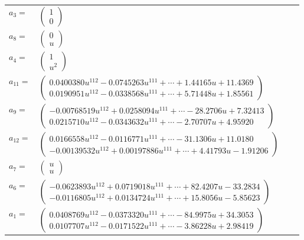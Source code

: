 \documentclass[1p]{elsarticle_modified}
\theoremstyle{definition}
\begin{document}
\begin{tabular}{m{7pt} m{180pt} m{7pt} m{180pt} }
\flushright $a_{3}=$&$\begin{pmatrix}1\\0\end{pmatrix}$ \\
\flushright $a_{8}=$&$\begin{pmatrix}0\\u\end{pmatrix}$ \\
\flushright $a_{4}=$&$\begin{pmatrix}1\\u^2\end{pmatrix}$ \\
\flushright $a_{11}=$&$\begin{pmatrix}0.0400380 u^{112}-0.0745263 u^{111}+\cdots+1.44165 u+11.4369\\0.0190951 u^{112}-0.0338568 u^{111}+\cdots+5.71448 u+1.85561\end{pmatrix}$ \\
\flushright $a_{9}=$&$\begin{pmatrix}-0.00768519 u^{112}+0.0258094 u^{111}+\cdots-28.2706 u+7.32413\\0.0215710 u^{112}-0.0343632 u^{111}+\cdots-2.70707 u+4.95920\end{pmatrix}$ \\
\flushright $a_{12}=$&$\begin{pmatrix}0.0166558 u^{112}-0.0116771 u^{111}+\cdots-31.1306 u+11.0180\\-0.00139532 u^{112}+0.00197886 u^{111}+\cdots+4.41793 u-1.91206\end{pmatrix}$ \\
\flushright $a_{7}=$&$\begin{pmatrix}u\\u\end{pmatrix}$ \\
\flushright $a_{6}=$&$\begin{pmatrix}-0.0623893 u^{112}+0.0719018 u^{111}+\cdots+82.4207 u-33.2834\\-0.0116805 u^{112}+0.0134724 u^{111}+\cdots+15.8056 u-5.85623\end{pmatrix}$ \\
\flushright $a_{1}=$&$\begin{pmatrix}0.0408769 u^{112}-0.0373320 u^{111}+\cdots-84.9975 u+34.3053\\0.0107707 u^{112}-0.0171522 u^{111}+\cdots-3.86228 u+2.98419\end{pmatrix}$ \\

\end{tabular}
\end{document}
